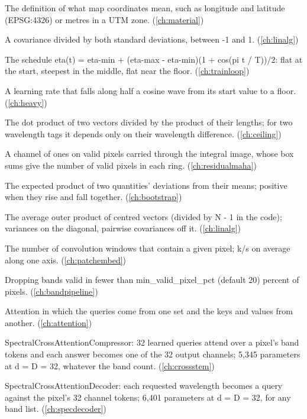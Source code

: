 \begin{description}[style=nextline,leftmargin=1.2em,font=\normalfont\bfseries]
\item[Coordinate reference system] The definition of what map coordinates mean, such as longitude and latitude (EPSG:4326) or metres in a UTM zone. (\cref{ch:material})
\item[Correlation] A covariance divided by both standard deviations, between -1 and 1. (\cref{ch:linalg})
\item[Cosine annealing] The schedule eta(t) = eta-min + (eta-max - eta-min)(1 + cos(pi t / T))/2: flat at the start, steepest in the middle, flat near the floor. (\cref{ch:trainloop})
\item[Cosine schedule] A learning rate that falls along half a cosine wave from its start value to a floor. (\cref{ch:heavy})
\item[Cosine similarity] The dot product of two vectors divided by the product of their lengths; for two wavelength tags it depends only on their wavelength difference. (\cref{ch:ceiling})
\item[Count channel] A channel of ones on valid pixels carried through the integral image, whose box sums give the number of valid pixels in each ring. (\cref{ch:residualmaha})
\item[Covariance] The expected product of two quantities' deviations from their means; positive when they rise and fall together. (\cref{ch:bootstrap})
\item[Covariance matrix] The average outer product of centred vectors (divided by N - 1 in the code); variances on the diagonal, pairwise covariances off it. (\cref{ch:linalg})
\item[Coverage count] The number of convolution windows that contain a given pixel; k/s on average along one axis. (\cref{ch:patchembed})
\item[Coverage pruning] Dropping bands valid in fewer than min\_valid\_pixel\_pct (default 20) percent of pixels. (\cref{ch:bandpipeline})
\item[Cross-attention] Attention in which the queries come from one set and the keys and values from another. (\cref{ch:attention})
\item[Cross-attention compressor] SpectralCrossAttentionCompressor: 32 learned queries attend over a pixel's band tokens and each answer becomes one of the 32 output channels; 5,345 parameters at d = D = 32, whatever the band count. (\cref{ch:crossstem})
\item[Cross-attention decoder] SpectralCrossAttentionDecoder: each requested wavelength becomes a query against the pixel's 32 channel tokens; 6,401 parameters at d = D = 32, for any band list. (\cref{ch:specdecoder})

\end{description}
